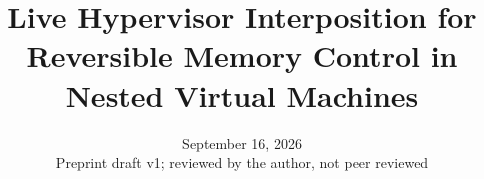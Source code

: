 \documentclass[11pt,letterpaper]{article}
\title{Live Hypervisor Interposition for Reversible Memory Control in Nested Virtual Machines}
\date{September 16, 2026\\[3pt]\small Preprint draft v1; reviewed by the author, not peer reviewed}
\begin{document}
\maketitle
\begin{abstract}

\end{abstract}







\appendix

\end{document}

